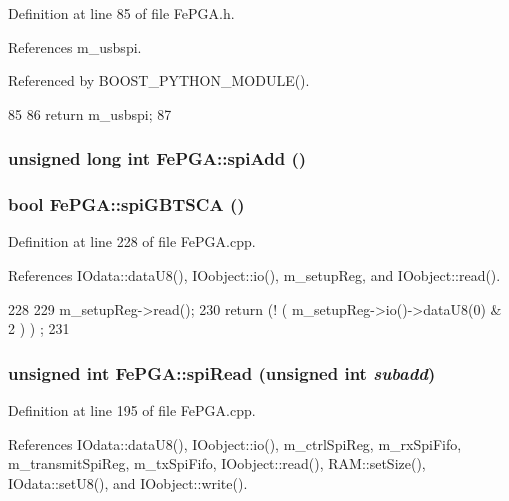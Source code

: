 Definition at line 85 of file FePGA.h.

References m\_\-usbspi.

Referenced by BOOST\_\-PYTHON\_\-MODULE().


\begin{DoxyCode}
85                     {
86     return m_usbspi;
87   }
\end{DoxyCode}
\hypertarget{classFePGA_a721de3fa12e207392cd6156027d2c776}{
\subsubsection[{spiAdd}]{\setlength{\rightskip}{0pt plus 5cm}unsigned long int FePGA::spiAdd ()}}
\label{classFePGA_a721de3fa12e207392cd6156027d2c776}
\hypertarget{classFePGA_ad305543bda4d68fe181cd7fa614b2fe1}{
\subsubsection[{spiGBTSCA}]{\setlength{\rightskip}{0pt plus 5cm}bool FePGA::spiGBTSCA ()}}
\label{classFePGA_ad305543bda4d68fe181cd7fa614b2fe1}


Definition at line 228 of file FePGA.cpp.

References IOdata::dataU8(), IOobject::io(), m\_\-setupReg, and IOobject::read().


\begin{DoxyCode}
228                       {
229   m_setupReg->read();
230   return (! ( m_setupReg->io()->dataU8(0) & 2 ) ) ;
231 }
\end{DoxyCode}
\hypertarget{classFePGA_a165f5b70ad30af106ecf9a3ace71d4eb}{
\subsubsection[{spiRead}]{\setlength{\rightskip}{0pt plus 5cm}unsigned int FePGA::spiRead (unsigned int {\em subadd})}}
\label{classFePGA_a165f5b70ad30af106ecf9a3ace71d4eb}


Definition at line 195 of file FePGA.cpp.

References IOdata::dataU8(), IOobject::io(), m\_\-ctrlSpiReg, m\_\-rxSpiFifo, m\_\-transmitSpiReg, m\_\-txSpiFifo, IOobject::read(), RAM::setSize(), IOdata::setU8(), and IOobject::write().


